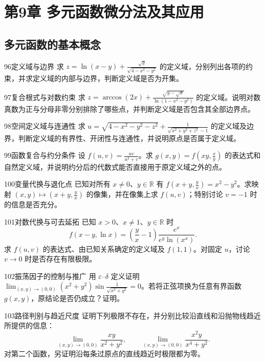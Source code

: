 \section{第9章 多元函数微分法及其应用}
\subsection{多元函数的基本概念}
\begin{exercise}{96}{定义域与边界}
求 $z=\ln(x-y)+\frac{\sqrt y}{\sqrt{4-x^2-y^2}}$ 的定义域，分别列出各项的约束，并求定义域的内部与边界，判断定义域是否为开集。
\end{exercise}
\begin{exercise}{97}{复合根式与对数约束}
求 $z=\arccos(2x)+\frac{\sqrt{y-\sqrt x}}{\ln(1-x^2-y^2)}$ 的定义域。说明对数真数为正与分母非零分别排除了哪些点，并判断定义域是否包含其全部边界点。
\end{exercise}
\begin{exercise}{98}{空间定义域与连通性}
求 $u=\sqrt{4-x^2-y^2-z^2}+\frac1{\sqrt{x^2+y^2+z^2}-1}$ 的定义域及边界，判断定义域的有界性、开闭性与连通性，并说明原点是否属于定义域。
\end{exercise}
\begin{exercise}{99}{函数复合与约分条件}
设 $f(u,v)=\frac{uv}{u^2+v}$。求 $g(x,y)=f(xy,\frac xy)$ 的表达式和自然定义域，并说明约分后的代数式能否直接用于原定义域之外的点。
\end{exercise}
\begin{exercise}{100}{变量代换与退化点}
已知对所有 $x\ne0$、$y\in\mathbb R$ 有 $f(x+y,\frac yx)=x^2-y^2$。求映射 $(x,y)\mapsto(x+y,\frac yx)$ 的像集，并在像集上求 $f(u,v)$；特别讨论 $v=-1$ 时的信息是否充分。
\end{exercise}
\begin{exercise}{101}{对数代换与可去延拓}
已知 $x>0$、$x\ne1$、$y\in\mathbb R$ 时
\[
f(x-y,\ln x)=\left(\frac yx-1\right)\frac{e^x}{e^y\ln(x^x)}.
\]
求 $f(u,v)$ 的表达式、由已知关系确定的定义域及 $f(1,1)$。对固定 $u$，讨论 $v\to0$ 时是否存在有限极限。
\end{exercise}
\begin{exercise}{102}{振荡因子的控制与推广}
用 $\varepsilon$--$\delta$ 定义证明 $\lim_{(x,y)\to(0,0)}(x^2+y^2)\sin\frac1{\sqrt{x^2+y^2}}=0$。若将正弦项换为任意有界函数 $g(x,y)$，原结论是否仍成立？证明。
\end{exercise}
\begin{exercise}{103}{路径判别与趋近尺度}
证明下列极限不存在，并分别比较沿直线和沿抛物线趋近所提供的信息：
\[
\lim_{(x,y)\to(0,0)}\frac{xy}{x^2+y^2},\qquad
\lim_{(x,y)\to(0,0)}\frac{x^2y}{x^4+y^2}.
\]
对第二个函数，另证明沿每条过原点的直线趋近时极限都为零。
\end{exercise}
